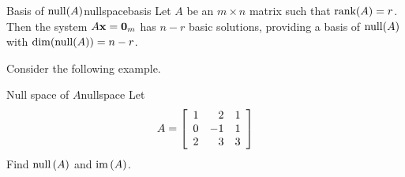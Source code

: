 \begin{theorem}{Basis of $\mbox{null}(A)$}{nullspacebasis}
Let $A$ be an $m \times n$ matrix such that $\mbox{rank}(A) = r$. Then the system $A{\bf x}={\bf 0}_m$ has $n-r$ basic solutions, providing a basis of $\mbox{null}(A)$ with $\dim(\mbox{null}(A))=n-r$.
\end{theorem}

Consider the following example. 

\begin{example}{Null space of $A$}{nullspace}
Let
\begin{equation*}
A=\left[
\begin{array}{rrr}
1 & 2 & 1 \\
0 & -1 & 1 \\
2 & 3 & 3
\end{array}
\right] 
\end{equation*}
Find $\mbox{null} \left( A\right) $ and $\mbox{im}\left( A\right)$.
\end{example}

